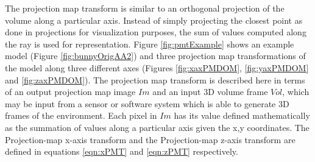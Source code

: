 The projection map transform is similar to an orthogonal projection of the volume along a particular axis. Instead of simply projecting the closest point as done in projections for visualization purposes, the sum of values computed along the ray is used for representation. Figure \ref{fig:pmtExample} shows an example model (Figure \ref{fig:bunnyOrigAA2}) and three projection map transformations of the model along three different axes (Figures \ref{fig:xaxPMDOM}, \ref{fig:yaxPMDOM} and \ref{fig:zaxPMDOM}). The projection map transform is described here in terms of an output projection map image $Im$ and an input 3D volume frame $Vol$, which may be input from a sensor or software system which is able to generate 3D frames of the environment. Each pixel in $Im$ has its value defined mathematically as the summation of values along a particular axis given the x,y coordinates. The Projection-map x-axis transform and the Projection-map z-axis transform are defined in equations \ref{eqn:xPMT} and \ref{eqn:zPMT} respectively. \\

